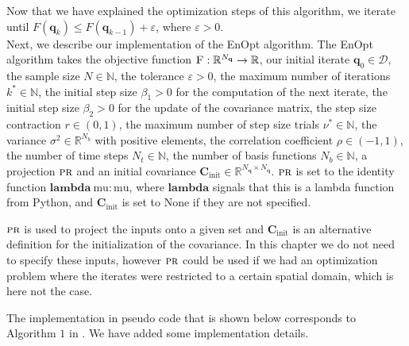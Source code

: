 Now that we have explained the optimization steps of this algorithm, we iterate until $F(\mathbf{q}_k)\leq F(\mathbf{q}_{k-1})+\varepsilon$, where $\varepsilon>0$.\\

Next, we describe our implementation of the EnOpt algorithm. The EnOpt algorithm takes the objective function $\textproc{F}:\mathbb{R}^{N_\mathbf{q}}\to\mathbb{R}$, our initial iterate $\mathbf{q}_0\in\mathcal{D}$, the sample size $N\in\mathbb{N}$, the tolerance $\varepsilon>0$, the maximum number of iterations $k^*\in\mathbb{N}$, the initial step size $\beta_1>0$ for the computation of the next iterate, the initial step size $\beta_2>0$ for the update of the covariance matrix, the step size contraction $r\in(0,1)$, the maximum number of step size trials $\nu^*\in\mathbb{N}$, the variance $\sigma^2\in\mathbb{R}^{N_b}$ with positive elements, the correlation coefficient $\rho\in(-1,1)$, the number of time steps $N_t\in\mathbb{N}$, the number of basis functions $N_b\in\mathbb{N}$, a projection $\textproc{pr}$ and an initial covariance $\mathbf{C}_\mathrm{init}\in\mathbb{R}^{N_\mathbf{q}\times N_\mathbf{q}}$. $\textproc{pr}$ is set to the identity function $\mathbf{lambda}\:\mathrm{mu}: \mathrm{mu}$, where $\mathbf{lambda}$ signals that this is a lambda function from Python, and $\mathbf{C}_\mathrm{init}$ is set to $\mathrm{None}$ if they are not specified.

$\textproc{pr}$ is used to project the inputs onto a given set and $\mathbf{C}_\mathrm{init}$ is an alternative definition for the initialization of the covariance. In this chapter we do not need to specify these inputs, however $\textproc{pr}$ could be used if we had an optimization problem where the iterates were restricted to a certain spatial domain, which is here not the case.

The implementation in pseudo code that is shown below corresponds to Algorithm $1$ in \cite{Keil2022-dj}. We have added some implementation details.

